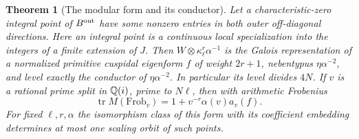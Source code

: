 \documentclass[a4paper,11pt]{article}
\newtheorem{theorem}[proposition]{Theorem}
\theoremstyle{definition}
\theoremstyle{remark}
\numberwithin{equation}{section}
\begin{document}
\begin{theorem}[The modular form and its conductor]\label{thm:form117}
Let a characteristic-zero integral point of \(B^{\rm out}\)
have some nonzero entries in both outer off-diagonal directions.
Here an integral point is a continuous local specialization into
the integers of a finite extension of \(J\). Then
\(W\otimes\kappa_\ell^r\alpha^{-1}\) is the Galois
representation of a normalized primitive cuspidal eigenform \(f\)
of weight \(2r+1\), nebentypus \(\eta\alpha^{-2}\), and level
exactly the conductor of \(\eta\alpha^{-2}\). In particular its
level divides \(4N\). If \(v\) is a rational prime split in
\(\mathbb Q(i)\), prime to \(N\ell\), then with arithmetic Frobenius
\begin{equation}
     \operatorname{tr}M(\mathrm{Frob}_v)
              =1+v^{-r}\alpha(v)a_v(f).                 \label{eq:form117}
\end{equation}
For fixed \(\ell,r,\alpha\) the isomorphism class of this form
with its coefficient embedding determines at most one scaling
orbit of such points.
\end{theorem}
\end{document}
